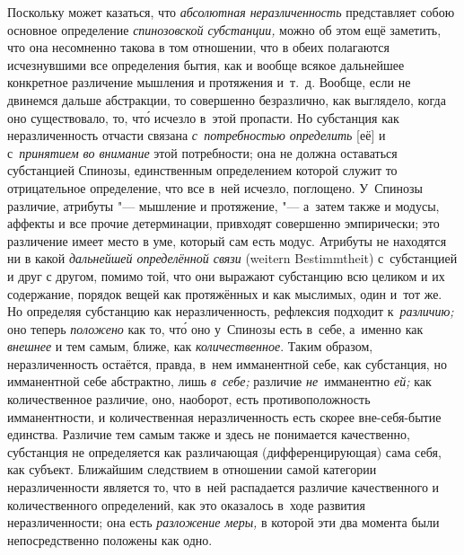 Поскольку может казаться, что {\em абсолютная неразличенность} представляет
собою основное определение {\em спинозовской субстанции,} можно об этом ещё
заметить, что она несомненно такова в том отношении, что в обеих полагаются
исчезнувшими все определения бытия, как и вообще всякое дальнейшее конкретное
различение мышления и протяжения и~т.~д. Вообще, если не двинемся дальше
абстракции, то совершенно безразлично, как выглядело, когда оно существовало,
то, чт\'{о} исчезло в~этой пропасти. Но субстанция как неразличенность отчасти
связана {\em с~потребностью определить} [её] и с~{\em принятием во внимание}
этой потребности; она не должна оставаться субстанцией Спинозы, единственным
определением которой служит то отрицательное определение, что все в~ней
исчезло, поглощено. У~Спинозы
различие, атрибуты "--- мышление и протяжение, "--- а~затем также и модусы,
аффекты и все прочие детерминации, привходят совершенно эмпирически; это
различение имеет место в уме, который сам есть модус. Атрибуты не находятся ни
в какой {\em дальнейшей определённой связи} (wei\-tern Be\-stimmt\-heit)
с~субстанцией и друг с другом, помимо той, что они выражают субстанцию всю
целиком и их содержание, порядок вещей как протяжённых и как мыслимых, один
и~тот же. Но определяя субстанцию как неразличенность, рефлексия подходит
к~{\em различию;} оно теперь {\em положено} как то, чт\'{о} оно у~Спинозы есть
в~себе, а~именно как {\em внешнее} и тем самым, ближе, как
{\em количественное}. Таким образом, неразличенность остаётся, правда, в~нем
имманентной себе, как субстанция, но имманентной себе абстрактно, лишь
{\em в~себе;} различие {\em не}~имманентно {\em ей;} как количественное
различие, оно, наоборот, есть противоположность имманентности, и количественная
неразличенность есть скорее вне-себя-бытие единства. Различие тем самым также и
здесь не понимается качественно, субстанция не определяется как различающая
(дифференцирующая) сама себя, как субъект. Ближайшим следствием в отношении
самой категории неразличенности является то, что в~ней распадается различие
качественного и количественного определений, как это оказалось в~ходе развития
неразличенности; она есть {\em разложение меры,} в которой эти два момента были
непосредственно положены как одно.

